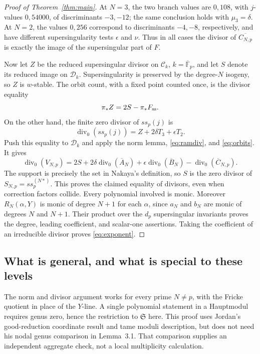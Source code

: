 \begin{proof}[Proof of Theorem~\ref{thm:main}]
At $N=3$, the two branch values are $0,108$, with $j$-values $0,54000$, of discriminants $-3,-12$; the same conclusion holds with $\mu_3=\delta$. At $N=2$, the values $0,256$ correspond to discriminants $-4,-8$, respectively, and have different supersingularity tests $\epsilon$ and $\nu$. Thus in all cases the divisor of $\overline{C_{N,p}}$ is exactly the image of the supersingular part of $F$.

Now let $Z$ be the reduced supersingular divisor on $\mathcal C_k$, $k=\overline{\mathbb F}_p$, and let $S$ denote its reduced image on $\mathcal D_k$. Supersingularity is preserved by the degree-$N$ isogeny, so $Z$ is $w$-stable. The orbit count, with a fixed point counted once, is the divisor equality
\begin{equation}\label{eq:orbits}
 \pi_*Z=2S-\pi_*F_{\rm ss}.
\end{equation}
On the other hand, the finite zero divisor of $ss_p(j)$ is
\[
 \operatorname{div}_0(ss_p(j))=Z+2\delta T_3+\epsilon T_2.
\]
Push this equality to $\mathcal D_k$ and apply the norm lemma, \eqref{eq:ramdiv}, and \eqref{eq:orbits}. It gives
\[
 \operatorname{div}_0(V_{N,p})
 =2S+2\delta\operatorname{div}_0(\overline A_N)
       +\epsilon\operatorname{div}_0(\overline B_N)
       -\operatorname{div}_0(\overline C_{N,p}).
\]
The support is precisely the set in Nakaya's definition, so $S$ is the zero divisor of $S_{N,p}=ss_p^{(N*)}$. This proves the claimed equality of divisors, even when correction factors collide. Every polynomial involved is monic. Moreover $R_N(\alpha,Y)$ is monic of degree $N+1$ for each $\alpha$, since $a_N$ and $b_N$ are monic of degrees $N$ and $N+1$. Their product over the $d_p$ supersingular invariants proves the degree, leading coefficient, and scalar-one assertions. Taking the coefficient of an irreducible divisor proves \eqref{eq:exponent}.
\end{proof}

\subsection{What is general, and what is special to these levels}
The norm and divisor argument works for every prime $N\ne p$, with the Fricke quotient in place of the $Y$-line. A single polynomial statement in a Hauptmodul requires genus zero, hence the restriction to $\mathfrak S$ here. This proof uses Jordan's good-reduction coordinate result and tame moduli description, but does not need his nodal genus comparison in Lemma~3.1. That comparison supplies an independent aggregate check, not a local multiplicity calculation.

